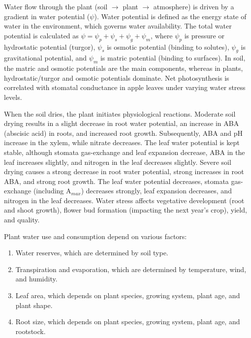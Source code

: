 \vspace{0.5em}
Water flow through the plant (soil $\rightarrow$ plant $\rightarrow$ atmosphere) is driven by a gradient in water potential ($\psi$). Water potential is defined as the energy state of water in the environment, which governs water availability. The total water potential is calculated as $\psi=\psi_p+\psi_s+\psi_g+\psi_m$, where $\psi_p$ is pressure or hydrostatic potential (turgor), $\psi_s$ is osmotic potential (binding to solutes), $\psi_g$ is gravitational potential, and $\psi_m$ is matric potential (binding to surfaces). In soil, the matric and osmotic potentials are the main components, whereas in plants, hydrostatic/turgor and osmotic potentials dominate. Net photosynthesis is correlated with stomatal conductance in apple leaves under varying water stress levels.

\vspace{0.5em}
When the soil dries, the plant initiates physiological reactions. Moderate soil drying results in a slight decrease in root water potential, an increase in ABA (abscisic acid) in roots, and increased root growth. Subsequently, ABA and pH increase in the xylem, while nitrate decreases. The leaf water potential is kept stable, although stomata gas-exchange and leaf expansion decrease, ABA in the leaf increases slightly, and nitrogen in the leaf decreases slightly. Severe soil drying causes a strong decrease in root water potential, strong increases in root ABA, and strong root growth. The leaf water potential decreases, stomata gas-exchange (including A$_{max}$) decreases strongly, leaf expansion decreases, and nitrogen in the leaf decreases. Water stress affects vegetative development (root and shoot growth), flower bud formation (impacting the next year's crop), yield, and quality.

\vspace{0.5em}
Plant water use and consumption depend on various factors: 

\begin{enumerate} 
    \item Water reserves, which are determined by soil type. 
    \item Transpiration and evaporation, which are determined by temperature, wind, and humidity. 
    \item Leaf area, which depends on plant species, growing system, plant age, and plant shape. 
    \item Root size, which depends on plant species, growing system, plant age, and rootstock. 
\end{enumerate} 

